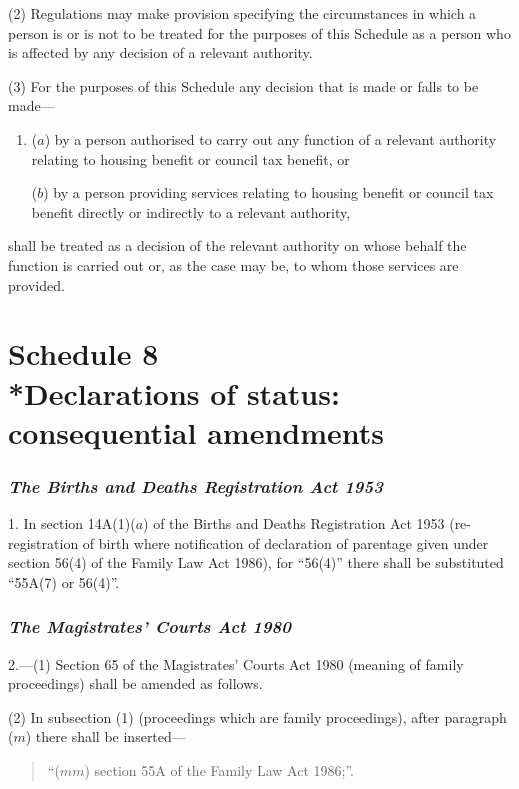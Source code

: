 \documentclass[12pt,a4paper]{article}
\begin{document}
(2) Regulations may make provision specifying the circumstances in which a person is or is not to be treated for the purposes of this Schedule as a person who is affected by any decision of a relevant authority.

(3) For the purposes of this Schedule any decision that is made or falls to be made—
\begin{enumerate}\item[]
($a$) by a person authorised to carry out any function of a relevant authority relating to housing benefit or council tax benefit, or

($b$) by a person providing services relating to housing benefit or council tax benefit directly or indirectly to a relevant authority,
\end{enumerate}
shall be treated as a decision of the relevant authority on whose behalf the function is carried out or, as the case may be, to whom those services are provided. 

\part[Schedule 8 --- Declarations of status: consequential amendments]{Schedule 8\\*Declarations of status: consequential amendments}

\renewcommand\parthead{--- Schedule 8}

\section*{\itshape The Births and Deaths Registration Act 1953}

1. In section 14A(1)($a$)  of the Births and Deaths Registration Act 1953 (re-registration of birth where notification of declaration of parentage given under section 56(4)  of the Family Law Act 1986), for “56(4)” there shall be substituted “55A(7)  or 56(4)”.

\section*{\itshape The Magistrates' Courts Act 1980}

2.---(1) Section 65 of the Magistrates' Courts Act 1980 (meaning of family proceedings) shall be amended as follows.

(2) In subsection (1)  (proceedings which are family proceedings), after paragraph ($m$) there shall be inserted—
\begin{quotation}
“($mm$) section 55A of the Family Law Act 1986;”.
\end{quotation}
\end{document}
